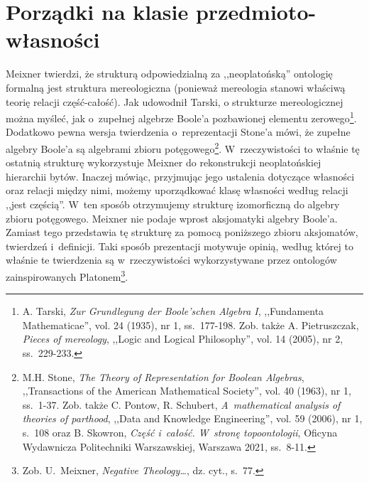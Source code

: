 \section{Porządki na klasie przedmioto-własności}

Meixner twierdzi, że strukturą odpowiedzialną za ,,neoplatońską'' ontologię formalną jest struktura mereologiczna (ponieważ mereologia stanowi właściwą teorię relacji część-całość). Jak
udowodnił Tarski, o strukturze mereologicznej można myśleć, jak o~zupełnej algebrze Boole'a pozbawionej elementu zerowego\footnote{A. Tarski, \textit{Zur Grundlegung der Boole'schen Algebra I}, ,,Fundamenta Mathematicae'', vol. 24 (1935), nr 1, ss.~177-198. Zob. także A. Pietruszczak, \textit{Pieces of mereology}, ,,Logic and Logical Philosophy'', vol. 14 (2005), nr 2, ss.~229-233.}. Dodatkowo pewna wersja twierdzenia o~reprezentacji Stone'a mówi, że zupełne algebry Boole'a są algebrami zbioru potęgowego\footnote{M.H. Stone, \textit{The Theory of Representation for Boolean Algebras}, ,,Transactions of the American Mathematical Society'', vol. 40 (1963), nr 1, ss.~1-37. Zob. także C. Pontow, R. Schubert, \textit{A~mathematical analysis of theories of parthood}, ,,Data and Knowledge Engineering'', vol. 59 (2006), nr 1, s.~108 oraz B. Skowron, \textit{Część i~całość. W~stronę topoontologii}, Oficyna Wydawnicza Politechniki Warszawskiej, Warszawa 2021, ss.~8-11.}.
W~rzeczywistości to właśnie tę ostatnią strukturę wykorzystuje Meixner do rekonstrukcji neoplatońskiej hierarchii bytów. Inaczej mówiąc, przyjmując jego ustalenia dotyczące własności oraz relacji między nimi, możemy uporządkować klasę własności według relacji ,,jest częścią''. W~ten sposób otrzymujemy strukturę izomorficzną do algebry zbioru potęgowego. Meixner nie podaje wprost aksjomatyki algebry Boole'a. Zamiast tego przedstawia tę strukturę za pomocą poniższego zbioru aksjomatów, twierdzeń i~definicji. Taki sposób prezentacji motywuje opinią, według której to właśnie te twierdzenia są w~rzeczywistości wykorzystywane przez ontologów zainspirowanych Platonem\footnote{Zob. U.~Meixner, \textit{Negative Theology\ldots}, dz. cyt., s.~77.}.

